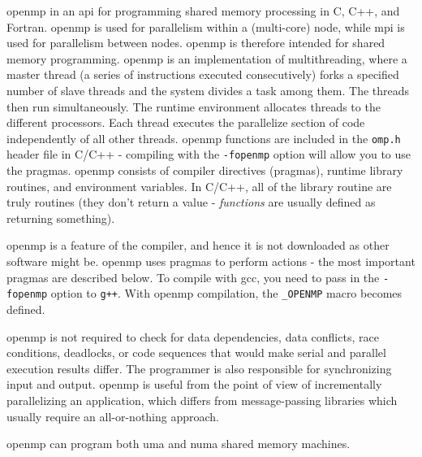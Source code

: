 \documentclass[10pt]{article}
\begin{document}
\begin{flushleft}
\gls{openmp} in an \gls{api} for programming shared memory processing in C, C++, and Fortran. \gls{openmp} is used for parallelism within a (multi-core) node, while \gls{mpi} is used for parallelism between nodes. \gls{openmp} is therefore intended for shared memory programming. \gls{openmp} is an implementation of multithreading, where a master thread (a series of instructions executed consecutively) forks a specified number of slave threads and the system divides a task among them. The threads then run simultaneously. The runtime environment allocates threads to the different processors. Each thread executes the parallelize section of code independently of all other threads. \gls{openmp} functions are included in the {\tt omp.h} header file in C/C++ - compiling with the {\tt -fopenmp} option will allow you to use the pragmas. \gls{openmp} consists of compiler directives (pragmas), runtime library routines, and environment variables. In C/C++, all of the library routine are truly routines (they don't return a value - \textit{functions} are usually defined as returning something). 

\gls{openmp} is a feature of the compiler, and hence it is not downloaded as other software might be. \gls{openmp} uses pragmas to perform actions - the most important pragmas are described below. To compile with gcc, you need to pass in the {\tt -fopenmp} option to {\tt g++}. With \gls{openmp} compilation, the {\tt \_OPENMP} macro becomes defined.

\gls{openmp} is not required to check for data dependencies, data conflicts, race conditions, deadlocks, or code sequences that would make serial and parallel execution results differ. The programmer is also responsible for synchronizing input and output. \gls{openmp} is useful from the point of view of incrementally parallelizing an application, which differs from message-passing libraries which usually require an all-or-nothing approach. 

\gls{openmp} can program both \gls{uma} and \gls{numa} shared memory machines. 


\end{flushleft}
\end{document}
